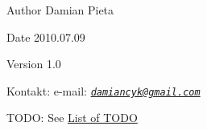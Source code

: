 \begin{DoxyAuthor}{Author}
Damian Pieta 
\end{DoxyAuthor}
\begin{DoxyDate}{Date}
2010.07.09 
\end{DoxyDate}
\begin{DoxyVersion}{Version}
1.0 
\end{DoxyVersion}
\begin{DoxyParagraph}{Kontakt:}
e-\/mail: {\itshape \href{mailto:damiancyk@gmail.com}{\tt damiancyk@gmail.com}\/} 
\end{DoxyParagraph}
\begin{DoxyParagraph}{TODO:}
See \hyperlink{todo}{List of TODO} 
\end{DoxyParagraph}
